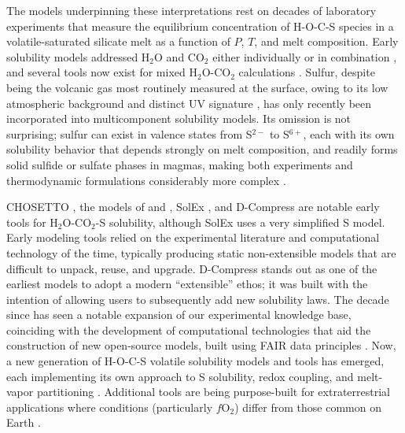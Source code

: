 \documentclass[draft, english]{volcanica-template}
\begin{document}
The models underpinning these interpretations rest on decades of laboratory experiments that measure the equilibrium concentration of H-O-C-S species in a volatile-saturated silicate melt as a function of $P$, $T$, and melt composition. Early solubility models addressed H$_2$O and CO$_2$ either individually or in combination \parencite[e.g.,][]{dixon1997, Newman2002, IaconoMarziano2012, iacovino2013, liu2005, allison2019}, and several tools now exist for mixed H$_2$O-CO$_2$ calculations \parencite[e.g.,][]{Newman2002,allison2022mafich,GhiorsoGualda2015,Iacovino2021,sun2026unified}. Sulfur, despite being the volcanic gas most routinely measured at the surface, owing to its low atmospheric background and distinct UV signature \parencite{oppenheimer2010ultraviolet}, has only recently been incorporated into multicomponent solubility models. Its omission is not surprising; sulfur can exist in valence states from S$^{2-}$ to S$^{6+}$, each with its own solubility behavior that depends strongly on melt composition, and readily forms solid sulfide or sulfate phases in magmas, making both experiments and thermodynamic formulations considerably more complex \parencite{baker2011modeling,fincham-richardson1954,o2002sulfide,jugo2005,carroll1985sulfide, Simon2026}.

CHOSETTO \parencite{moretti2003model,moretti2004oxidation}, the models of \textcite{gaillard2011atmospheric} and \textcite{gaillard2013geochemical}, SolEx \parencite{witham2012solex}, and D-Compress \parencite{Burgisser2015} are notable early tools for H$_2$O-CO$_2$-S solubility, although SolEx uses a very simplified S model. Early modeling tools relied on the experimental literature and computational technology of the time, typically producing static non-extensible models that are difficult to unpack, reuse, and upgrade. D-Compress stands out as one of the earliest models to adopt a modern ``extensible'' ethos; it was built with the intention of allowing users to subsequently add new solubility laws. The decade since has seen a notable expansion of our experimental knowledge base, coinciding with the development of computational technologies that aid the construction of new open-source models, built using FAIR data principles \parencite{wilkinson2016FAIR}. Now, a new generation of H-O-C-S volatile solubility models and tools has emerged, each implementing its own approach to S solubility, redox coupling, and melt-vapor partitioning \parencite[e.g.,][]{Liggins2020,Liggins2022,Sun2022,Sun2024,Ding2023,hughes2024,Hughes2025volfe, ghiorso2023melts+}. Additional tools are being purpose-built for extraterrestrial applications where conditions (particularly $f$O$_2$) differ from those common on Earth \parencite{bower2025diversity}.
\end{document}
